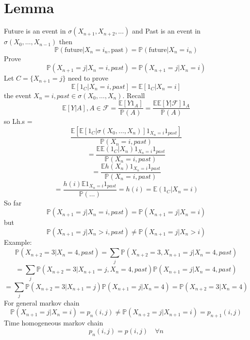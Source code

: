 \documentclass[11pt]{article}
\begin{document}
\section{Lemma}
Future is an event in $\sigma(X_{n+1},X_{n+2},\dots)$ and Past is an event in $\sigma(X_0,\dots,X_{n-1})$ then
\[
    \mathbb{P}(\text{future} | X_n = i_n, \text{past}) = \mathbb{P}(\text{future} | X_n = i_n)
\] 
Prove
\[
    \mathbb{P}(X_{n+1} = j | X_n =i, past) = \mathbb{P}(X_{n+1} = j | X_n = i)
\] 
Let $C = \{X_{n+1} = j\}$
need to prove
\[
    \mathbb{E}[1_{C} | X_{n} = i, past] = \mathbb{E}[1_C | X_n =i]
\] 
the event $X_n =i, past \in \sigma(X_0,\dots,X_n)$. Recall
\[
    \mathbb{E}[Y | A], A \in \mathcal{F} = \frac{\mathbb{E}[Y 1_A]}{ \mathbb{P}(A)} = \frac{ \mathbb{E} \mathbb{E}[Y | \mathcal{F}] 1_A}{ \mathbb{P}(A)}
\] 
so Lh.s =
\[
    \frac{  \mathbb{E}[\mathbb{E}[1_C | \sigma(X_0,\dots,X_n)] 1_{X_{n} = i} 1_{past}]}{ \mathbb{P}(X_{n}= i, past)}
\] 
\[
    = \frac{ \mathbb{E} \mathbb{E}( 1_C | X_n) 1_{X_{n} = i} 1_{past}}{ \mathbb{P}(X_n = i, past)}
\] 
\[
    = \frac{ \mathbb{E} h(X_n) 1_{X_{n}= i} 1_{past}}{ \mathbb{P}(X_{n} = i, past)}
\] 
\[
    = \frac{h(i) \mathbb{E} 1_{X_{n} = i} 1_{past}}{ \mathbb{P}(\dots)} = h(i) = \mathbb{E}(1_C | X_n = i)
\] 
So far
\[
    \mathbb{P}(X_{n+1} = j| X_n = i, past) = \mathbb{P}(X_{n+1} = j | X_n = i)
\] 
but
\[
    \mathbb{P}(X_{n+1} =j | X_n > i, past) \ne \mathbb{P}(X_{n+1} = j | X_n > i)
\] 
Example: 
\[
\mathbb{P}(X_{n+2} = 3 | X_n = 4, past) = \sum_{j}^{} \mathbb{P}(X_{n+2} = 3, X_{n+1} =j | X_n = 4, past) \]\[
= \sum_{j}^{} \mathbb{P}(X_{n+2} = 3 | X_{n+1} = j, X_n = 4, past) \mathbb{P}(X_{n+1} = j | X_n = 4, past)
\] 
\[
    = \sum_{j}^{} \mathbb{P}(X_{n+2} = 3 | X_{n+1} = j) \mathbb{P}(X_{n+1} = j | X_n = 4) = \mathbb{P}(X_{n+2} = 3 | X_n = 4)
\] 
For general markov chain
\[
    \mathbb{P}(X_{n+1} = j | X_n = i) = p_n(i,j) \ne \mathbb{P}(X_{n+2} =j | X_{n+1} = i) = p_{n+1}(i,j)
\] 
Time homogeneous markov chain
\[
p_n(i,j) = p(i,j) \quad \forall n
\] 
\end{document}
